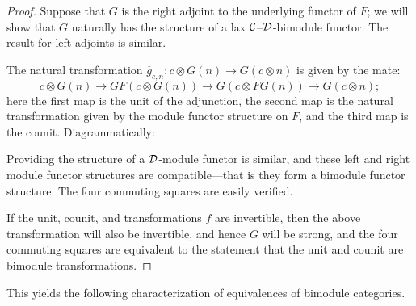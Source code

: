 \documentclass{amsart}
\begin{document}
\begin{proof}
Suppose that $G$ is the right adjoint to the underlying functor of $F$; we will show that $G$ naturally has the structure of a lax $\mathcal C$--$\mathcal D$-bimodule functor.  The result for left adjoints is similar.

The natural transformation $\overline{g}_{c,n}: c \otimes G(n) \rightarrow G(c \otimes n)$ is given by the mate:
$$c \otimes G(n) \rightarrow G F(c \otimes G(n)) \rightarrow G(c \otimes FG(n)) \rightarrow G(c \otimes n);$$
here the first map is the unit of the adjunction, the second map is the natural transformation given by the module functor structure on $F$, and the third map is the counit.  Diagrammatically: 
\begin{center}
\end{center}

\noindent %
Providing the structure of a $\mathcal D$-module functor is similar, and these left and right module functor structures are compatible---that is they form a bimodule functor structure. The four commuting squares are easily verified. 

If the unit, counit, and transformations $f$ are invertible, then the above transformation will also be invertible, and hence $G$ will be strong, and the four commuting squares are equivalent to the statement that the unit and counit are bimodule transformations.  
\end{proof}

This yields the following characterization of equivalences of bimodule categories.
\end{document}
